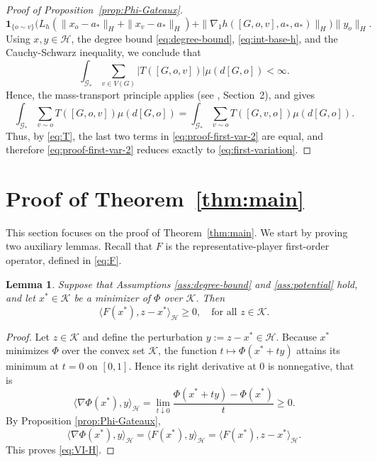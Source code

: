 \documentclass[11pt]{article}
\newcommand{\be}{\begin{equation}}
\newcommand{\ee}{\end{equation}}
\newtheorem{lemma}[theorem]{Lemma}
\numberwithin{equation}{section}
\begin{document}
\begin{proof}[Proof of Proposition~\ref{prop:Phi-Gateaux}]
\[\mathbf 1_{\{o\sim v\}}
\Big(
L_h(\|x_o-a_\ast\|_H+\|x_v-a_\ast\|_H)
+
\|\nabla_1 h([G,o,v],a_\ast,a_\ast)\|_H
\Big)\|{y}_o\|_H.
\]
Using $x,y\in\mathcal{H}$, the degree bound \eqref{eq:degree-bound}, \eqref{eq:int-base-h}, and the Cauchy-Schwarz inequality, we conclude that
\be
\int_{\mathcal{G}_\ast}\sum_{v\in V(G)}|T([G,o,v])|\mu(d[G,o])<\infty.
\ee
Hence, the mass-transport principle applies (see \cite{Aldous2007}, Section~2), and gives
\[
\int_{\mathcal G_\ast}\sum_{v\sim o} T([G,o,v])\mu(d[G,o])
=
\int_{\mathcal G_\ast}\sum_{v\sim o} T([G,v,o])\mu(d[G,o]).
\]
Thus, by \eqref{eq:T}, the last two terms in \eqref{eq:proof-first-var-2} are equal, and therefore \eqref{eq:proof-first-var-2}
reduces exactly to \eqref{eq:first-variation}.
\end{proof}


\section{Proof of Theorem~\ref{thm:main}}\label{sec:proof-main}

This section focuses on the proof of Theorem~\ref{thm:main}. We start by proving two auxiliary lemmas.
Recall that $F$ is the representative-player first-order operator, defined in \eqref{eq:F}. 
\begin{lemma}\label{lemma:VI-minimizer}
Suppose that Assumptions \ref{ass:degree-bound} and \ref{ass:potential} hold, and let \(x^\ast\in\mathcal K\) be a minimizer of \(\Phi\) over \(\mathcal K\). Then
\begin{equation} \label{eq:VI-H}
\langle F(x^\ast),z-x^\ast\rangle_{\mathcal H}\ge 0,
\quad \text{for all } z\in\mathcal K.
\end{equation}
\end{lemma}

\begin{proof}
Let \(z\in\mathcal K\) and define the perturbation $y:=z-x^\ast\in\mathcal H$.
Because \(x^\ast\) minimizes \(\Phi\) over the convex set \(\mathcal K\), the function \(t\mapsto \Phi(x^\ast+ty)\) attains its minimum at \(t=0\) on \([0,1]\). Hence its right derivative at \(0\) is nonnegative, that is
\[
\langle \nabla\Phi(x^\ast),y\rangle_{\mathcal H}
=
\lim_{t\downarrow 0}\frac{\Phi(x^\ast+ty)-\Phi(x^\ast)}{t}
\ge 0.
\] 
By Proposition \ref{prop:Phi-Gateaux},
\[
\langle \nabla\Phi(x^\ast),y\rangle_{\mathcal H}
=
\langle F(x^\ast),y\rangle_{\mathcal H}
=
\langle F(x^\ast),z-x^\ast\rangle_{\mathcal H}.
\]
This proves \eqref{eq:VI-H}.
\end{proof}
\end{document}
